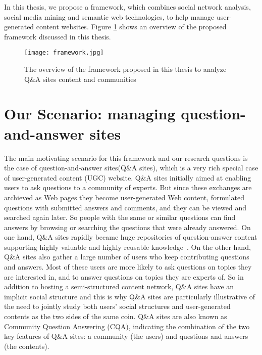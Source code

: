 In this thesis, we propose a framework, which combines social network analysis, social media mining and semantic web technologies, to help manage user-generated content websites. Figure \ref{fig:framework} shows an overview of the proposed framework discussed in this thesis.

\begin{figure}
\centering
\texttt{[image: framework.jpg]}  
\caption{The overview of the framework proposed in this thesis to analyze Q\&A sites content and communities}
\label{fig:framework} 
\end{figure}



\section{Our Scenario: managing question-and-answer sites}


The main motivating scenario for this framework and our research questions is the case of question-and-answer sites(Q\&A sites), which is a very rich special case of user-generated content (UGC) website. Q\&A sites initially aimed at enabling users to ask questions to a community of experts. But since these exchanges are archieved as Web pages they become user-generated Web content, formulated questions with submitted answers and comments, and they can be viewed and searched again later. So people with the same or similar questions can find answers by browsing or searching the questions that were already answered. On one hand, Q\&A sites rapidly became huge repositories of question-answer content supporting highly valuable and highly reusable knowledge~\cite{anderson2012discovering}. On the other hand, Q\&A sites also gather a large number of users who keep contributing questions and answers. Most of these users are more likely to ask questions on topics they are interested in, and to answer questions on topics they are experts of. So in addition to hosting a semi-structured content network, Q\&A sites have an implicit social structure and this is why Q\&A sites are particularly illustrative of the need to jointly study both users' social structures and user-generated contents as the two sides of the same coin.
Q\&A sites are also known as Community Question Answering (CQA), indicating the combination of the two key features of Q\&A sites: a community (the users) and questions and answers (the contents).


